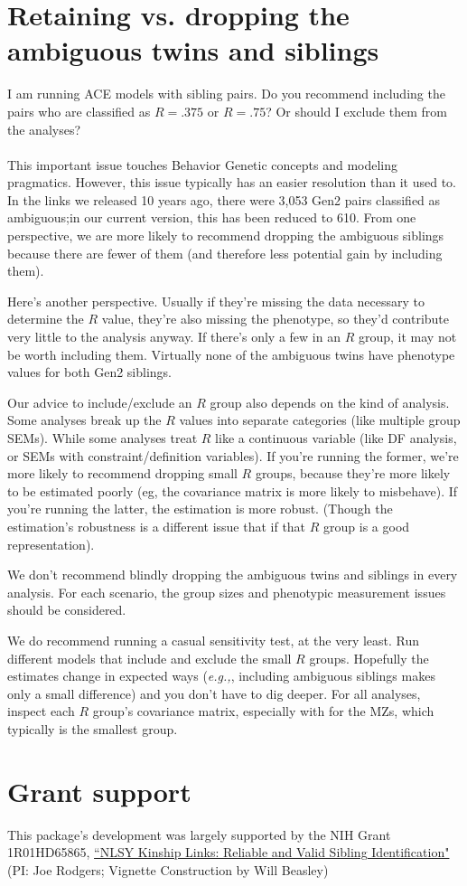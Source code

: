 \documentclass{article}\usepackage[]{graphicx}\usepackage[]{color}
\begin{document}
\section{Retaining vs. dropping the ambiguous twins and siblings}
\textsf{I am running ACE models with sibling pairs.  Do you recommend including the pairs who are classified as $R=.375$ or $R=.75$?  Or should I exclude them from the analyses?}\\ \\
This important issue touches Behavior Genetic concepts and modeling pragmatics.  However, this issue typically has an easier resolution than it used to.  In the links we released 10 years ago, there were 3,053 Gen2 pairs classified as ambiguous;in our current version, this has been reduced to 610.  From one perspective, we are more likely to recommend dropping the ambiguous siblings because there are fewer of them (and therefore less potential gain by including them).

Here's another perspective.  Usually if they're missing the data necessary to determine the $R$ value, they're also missing the phenotype, so they'd contribute very little to the analysis anyway.  If there's only a few in an $R$ group, it may not be worth including them.  Virtually none of the ambiguous twins have phenotype values for both Gen2 siblings.

Our advice to include/exclude an $R$ group also depends on the kind of analysis.  Some analyses break up the $R$ values into separate categories (like multiple group SEMs).  While some analyses treat $R$ like a continuous variable (like DF analysis, or SEMs with constraint/definition variables).  If you're running the former, we're more likely to recommend dropping small $R$ groups, because they're more likely to be estimated poorly (eg, the covariance matrix is more likely to misbehave).  If you're running the latter, the estimation is more robust.  (Though the estimation's robustness is a different issue that if that $R$ group is a good representation).

We don't recommend blindly dropping the ambiguous twins and siblings in every analysis.  For each scenario, the group sizes and phenotypic measurement issues should be considered.

We do recommend running a casual sensitivity test, at the very least.  Run different models that include and exclude the small $R$ groups.  Hopefully the estimates change in expected ways (\emph{e.g.,}, including ambiguous siblings makes only a small difference)  and you don't have to dig deeper.  For all analyses, inspect each $R$ group's covariance matrix, especially with for the MZs, which typically is the smallest group. 


\section{Grant support}
This package's development was largely supported by the NIH Grant 1R01HD65865, \href{http://taggs.hhs.gov/AwardDetail.cfm?s_Award_Num=R01HD065865&n_Prog_Office_Code=50}{``NLSY Kinship Links: Reliable and Valid Sibling Identification"} (PI: Joe Rodgers; Vignette Construction by Will Beasley)
\end{document}
